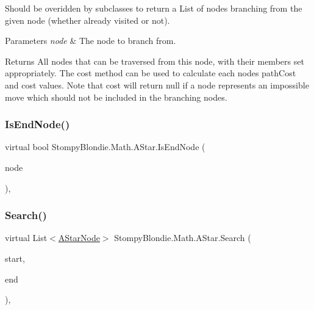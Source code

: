 Should be overidden by subclasses to return a List of nodes branching from the given node (whether already visited or not).


\begin{DoxyParams}{Parameters}
{\em node} & The node to branch from. \\
\hline
\end{DoxyParams}
\begin{DoxyReturn}{Returns}
All nodes that can be traversed from this node, with their members set appropriately. The cost method can be used to calculate each node\textquotesingle{}s path\+Cost and cost values. Note that cost will return null if a node represents an impossible move which should not be included in the branching nodes. 
\end{DoxyReturn}
\mbox{\label{class_stompy_blondie_1_1_math_1_1_a_star_a310801f602808b6cf4d7cb468a825442}} 
\subsubsection{\texorpdfstring{Is\+End\+Node()}{IsEndNode()}}
{\footnotesize\ttfamily virtual bool Stompy\+Blondie.\+Math.\+A\+Star.\+Is\+End\+Node (\begin{DoxyParamCaption}\item[{\mbox{\hyperlink{class_stompy_blondie_1_1_math_1_1_a_star_node}{A\+Star\+Node}}}]{node }\end{DoxyParamCaption})\hspace{0.3cm}{\ttfamily [inline]}, {\ttfamily [virtual]}}

\mbox{\label{class_stompy_blondie_1_1_math_1_1_a_star_abba11aaec721f3d70f8998d64ccdb299}} 
\subsubsection{\texorpdfstring{Search()}{Search()}}
{\footnotesize\ttfamily virtual List$<$\mbox{\hyperlink{class_stompy_blondie_1_1_math_1_1_a_star_node}{A\+Star\+Node}}$>$ Stompy\+Blondie.\+Math.\+A\+Star.\+Search (\begin{DoxyParamCaption}\item[{Object}]{start,  }\item[{Object}]{end }\end{DoxyParamCaption})\hspace{0.3cm}{\ttfamily [inline]}, {\ttfamily [virtual]}}

